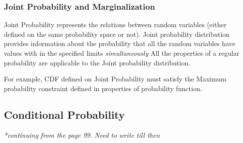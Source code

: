 \documentclass[12pt]{report} %
\begin{document}
	\subsubsection*{Joint Probability and Marginalization} Joint Probability represents the relations between random variables (either defined on the same probability space or not). Joint probability distribution  provides information about the probability that all the random variables have values with in the specified limits \textit{simultaneously} All the properties of a regular probability are applicable to the Joint probability distribution.
	
	For example, CDF defined on Joint Probability must satisfy the Maximum probability constraint defined in properties of probability function. 
	\begin{center}	
		\subsection*{Conditional Probability}	
	\end{center}
	\textit{*continuing from the page 99. Need to write till then}
	
\end{document}
